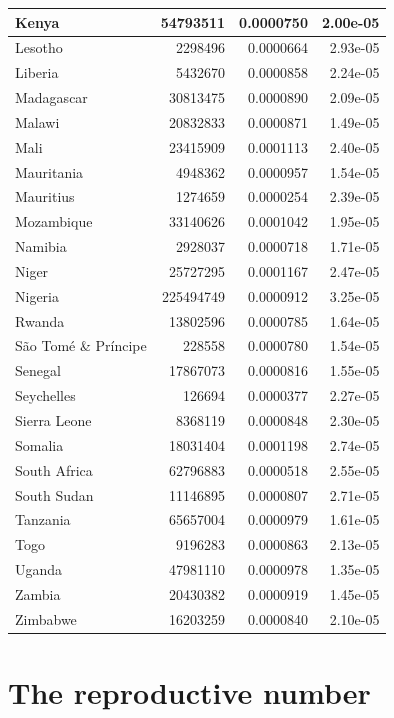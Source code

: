 \documentclass[
]{book}
\begin{document}
\begin{table}
\begin{tabular}[t]{l|r|r|r}
\hline
Kenya & 54793511 & 0.0000750 & 2.00e-05\\
\hline
Lesotho & 2298496 & 0.0000664 & 2.93e-05\\
\hline
Liberia & 5432670 & 0.0000858 & 2.24e-05\\
\hline
Madagascar & 30813475 & 0.0000890 & 2.09e-05\\
\hline
Malawi & 20832833 & 0.0000871 & 1.49e-05\\
\hline
Mali & 23415909 & 0.0001113 & 2.40e-05\\
\hline
Mauritania & 4948362 & 0.0000957 & 1.54e-05\\
\hline
Mauritius & 1274659 & 0.0000254 & 2.39e-05\\
\hline
Mozambique & 33140626 & 0.0001042 & 1.95e-05\\
\hline
Namibia & 2928037 & 0.0000718 & 1.71e-05\\
\hline
Niger & 25727295 & 0.0001167 & 2.47e-05\\
\hline
Nigeria & 225494749 & 0.0000912 & 3.25e-05\\
\hline
Rwanda & 13802596 & 0.0000785 & 1.64e-05\\
\hline
São Tomé \& Príncipe & 228558 & 0.0000780 & 1.54e-05\\
\hline
Senegal & 17867073 & 0.0000816 & 1.55e-05\\
\hline
Seychelles & 126694 & 0.0000377 & 2.27e-05\\
\hline
Sierra Leone & 8368119 & 0.0000848 & 2.30e-05\\
\hline
Somalia & 18031404 & 0.0001198 & 2.74e-05\\
\hline
South Africa & 62796883 & 0.0000518 & 2.55e-05\\
\hline
South Sudan & 11146895 & 0.0000807 & 2.71e-05\\
\hline
Tanzania & 65657004 & 0.0000979 & 1.61e-05\\
\hline
Togo & 9196283 & 0.0000863 & 2.13e-05\\
\hline
Uganda & 47981110 & 0.0000978 & 1.35e-05\\
\hline
Zambia & 20430382 & 0.0000919 & 1.45e-05\\
\hline
Zimbabwe & 16203259 & 0.0000840 & 2.10e-05\\
\hline
\end{tabular}
\end{table}

\section{The reproductive number}\label{the-reproductive-number}
\end{document}
